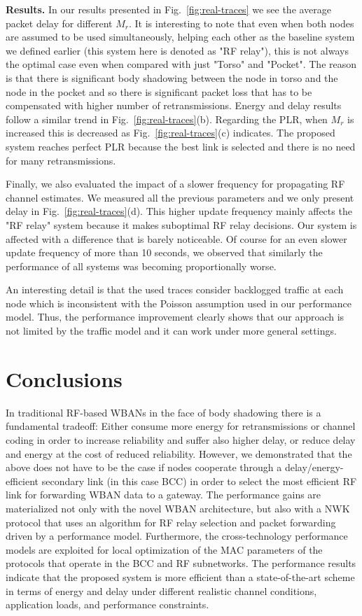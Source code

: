 \documentclass[10pt]{IEEEtran}
\newcounter{section:outage-analysis}
\begin{document}
\textbf{Results.} In our results presented in Fig.~\ref{fig:real-traces} we see the average packet delay for different $M_r$. It is interesting to note that even when both nodes are assumed to be used simultaneously, helping each other as the baseline system we defined earlier (this system here is denoted as "RF relay"), this is not always the optimal case even when compared with just "Torso" and "Pocket". The reason is that there is significant body shadowing between the node in torso and the node in the pocket and so there is significant packet loss that has to be compensated with higher number of retransmissions. Energy and delay results follow a similar trend in Fig.~\ref{fig:real-traces}(b). Regarding the PLR, when $M_r$ is increased this is decreased as Fig.~\ref{fig:real-traces}(c) indicates. The proposed system reaches perfect PLR because the best link is selected and there is no need for many retransmissions.

Finally, we also evaluated the impact of a slower frequency for propagating RF channel estimates. We measured all the previous parameters and we only present delay in Fig.~\ref{fig:real-traces}(d). This higher update frequency mainly affects the "RF relay" system because it makes suboptimal RF relay decisions. Our system is affected with a difference that is barely noticeable. Of course for an even slower update frequency of more than 10 seconds, we observed that similarly the performance of all systems was becoming proportionally worse.

An interesting detail is that the used traces consider backlogged traffic at each node which is inconsistent with the Poisson assumption used in our performance model. Thus, the performance improvement clearly shows that our approach is not limited by the traffic model and it can work under more general settings.

\section{Conclusions}
\label{section:conclusions}
In traditional RF-based WBANs in the face of body shadowing there is a fundamental tradeoff: Either consume more energy for retransmissions or channel coding in order to increase reliability and suffer also higher delay, or reduce delay and energy at the cost of reduced reliability. However, we demonstrated that the above does not have to be the case if nodes cooperate through a delay/energy-efficient secondary link (in this case BCC) in order to select the most efficient RF link for forwarding WBAN data to a gateway. The performance gains are materialized not only with the novel WBAN architecture, but also with a NWK protocol that uses an algorithm for RF relay selection and packet forwarding driven by a performance model. Furthermore, the cross-technology performance models are exploited for local optimization of the MAC parameters of the protocols that operate in the BCC and RF subnetworks. The performance results indicate that the proposed system is more efficient than a state-of-the-art scheme in terms of energy and delay under different realistic channel conditions, application loads, and performance constraints.
\end{document}

